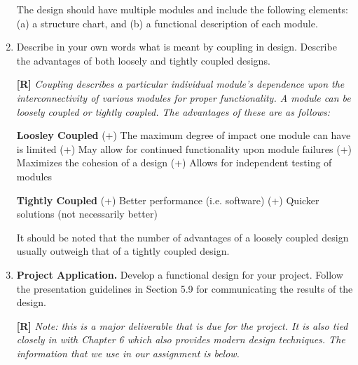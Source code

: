 \begin{enumerate}
The design should have multiple modules and include the following
elements: (a) a structure chart, and (b) a functional description of
each module.



\item
  Describe in your own words what is meant by coupling in design.
  Describe the advantages of both loosely and tightly coupled designs.

  \begin{onlysolution}
    \textbf{[R]}
    \itshape
    Coupling describes a particular individual module’s dependence upon 
    the interconnectivity of various modules for proper functionality. 
    A module can be loosely coupled or tightly coupled. The advantages 
    of these are as follows:

    \textbf{Loosley Coupled}
    (+) The maximum degree of impact one module can have is limited 
    (+) May allow for continued functionality upon module failures
    (+) Maximizes the cohesion of a design
    (+) Allows for independent testing of modules

    \textbf{Tightly Coupled}
    (+) Better performance (i.e. software)
    (+) Quicker solutions (not necessarily better)

    It should be noted that the number of advantages of a loosely coupled 
    design usually outweigh that of a tightly coupled design.
  \end{onlysolution}

\item
  \textbf{Project Application.} Develop a functional design for your
  project. Follow the presentation guidelines in Section 5.9 for
  communicating the results of the design.

  \begin{onlysolution}
    \textbf{[R]}
    \itshape
    \emph{Note:} this is a major deliverable that is due for the project. 
    It is also tied closely in with Chapter 6 which also provides modern 
    design techniques. The information that we use in our assignment is 
    below.
  \end{onlysolution}

\end{enumerate}

